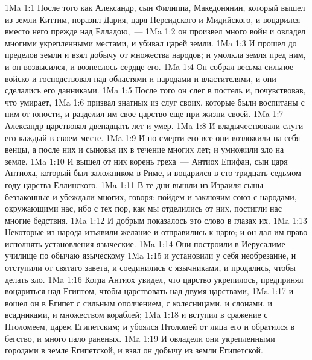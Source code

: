 \vs 1Ma 1:1 После того как Александр, сын Филиппа, Македонянин, который вышел из земли Киттим, поразил Дария, царя Персидского и Мидийского, и воцарился вместо него прежде над Елладою,~---
\vs 1Ma 1:2 он произвел много войн и овладел многими укрепленными местами, и убивал царей земли.
\vs 1Ma 1:3 И прошел до пределов земли и взял добычу от множества народов; и умолкла земля пред ним, и он возвысился, и вознеслось сердце его.
\vs 1Ma 1:4 Он собрал весьма сильное войско и господствовал над областями и народами и властителями, и они сделались его данниками.
\vs 1Ma 1:5 После того он слег в постель и, почувствовав, что умирает,
\vs 1Ma 1:6 призвал знатных из слуг своих, которые были воспитаны с ним от юности, и разделил им свое царство еще при жизни своей.
\rsbpar\vs 1Ma 1:7 Александр царствовал двенадцать лет и умер.
\vs 1Ma 1:8 И владычествовали слуги его каждый в своем месте.
\vs 1Ma 1:9 И по смерти его все они возложили на себя венцы, а после них и сыновья их в течение многих лет; и умножили зло на земле.
\vs 1Ma 1:10 И вышел от них корень греха~--- Антиох Епифан, сын царя Антиоха, который был заложником в Риме, и воцарился в сто тридцать седьмом году царства Еллинского.
\rsbpar\vs 1Ma 1:11 В те дни вышли из Израиля сыны беззаконные и убеждали многих, говоря: пойдем и заключим союз с народами, окружающими нас, ибо с тех пор, как мы отделились от них, постигли нас многие бедствия.
\vs 1Ma 1:12 И добрым показалось это слово в глазах их.
\vs 1Ma 1:13 Некоторые из народа изъявили желание и отправились к царю; и он дал им право исполнять установления языческие.
\vs 1Ma 1:14 Они построили в Иерусалиме училище по обычаю языческому
\vs 1Ma 1:15 и установили у себя необрезание, и отступили от святаго завета, и соединились с язычниками, и продались, чтобы делать зло.
\rsbpar\vs 1Ma 1:16 Когда Антиох увидел, что царство укрепилось, предпринял воцариться над Египтом, чтобы царствовать над двумя царствами,
\vs 1Ma 1:17 и вошел он в Египет с сильным ополчением, с колесницами, и слонами, и всадниками, и множеством кораблей;
\vs 1Ma 1:18 и вступил в сражение с Птоломеем, царем Египетским; и убоялся Птоломей от лица его и обратился в бегство, и много пало раненых.
\vs 1Ma 1:19 И овладели они укрепленными городами в земле Египетской, и взял он добычу из земли Египетской.
